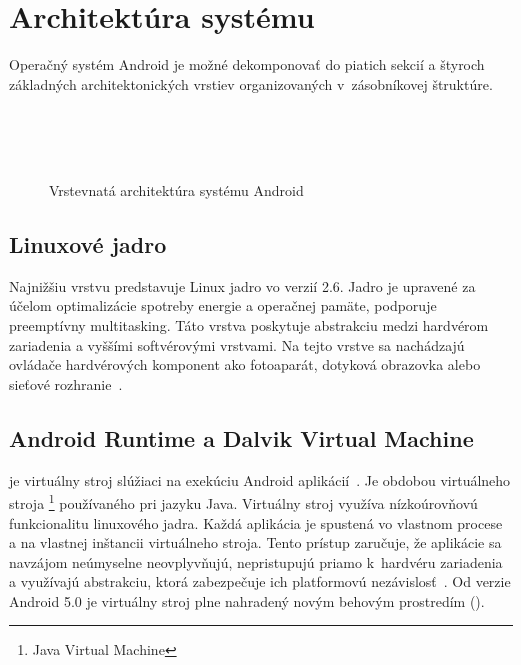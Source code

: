 \section{Architektúra systému}
Operačný systém Android je možné dekomponovať do piatich sekcií a štyroch základných architektonických vrstiev organizovaných v~zásobníkovej štruktúre.
\begin{figure} [htb]
 \centering
	\\
	\\
	\\
  \caption{Vrstevnatá architektúra systému Android}
  \label{fig:mulogo1}
\end{figure}
\subsection{Linuxové jadro}
Najnižšiu vrstvu predstavuje Linux jadro vo verzií 2.6. Jadro je upravené za účelom optimalizácie spotreby energie a operačnej pamäte, podporuje preemptívny multitasking. Táto vrstva poskytuje abstrakciu medzi hardvérom zariadenia a vyššími softvérovými vrstvami. Na tejto vrstve sa nachádzajú ovládače hardvérových komponent ako fotoaparát, dotyková obrazovka alebo sieťové rozhranie~\cite{architecture}.
\subsection{Android Runtime a Dalvik Virtual Machine}
 je virtuálny stroj slúžiaci na exekúciu Android aplikácií~\cite{dalvik}. Je obdobou virtuálneho stroja \footnote{Java Virtual Machine} používaného pri jazyku Java. Virtuálny stroj  využíva nízkoúrovňovú funkcionalitu linuxového jadra. Každá aplikácia je spustená vo vlastnom procese a na vlastnej inštancii virtuálneho stroja. Tento prístup zaručuje, že aplikácie sa navzájom neúmyselne neovplyvňujú, nepristupujú priamo k~hardvéru zariadenia a využívajú abstrakciu, ktorá zabezpečuje ich platformovú nezávislosť~\cite{architecture}.  Od verzie Android 5.0 je virtuálny stroj  plne nahradený novým behovým prostredím  ().
